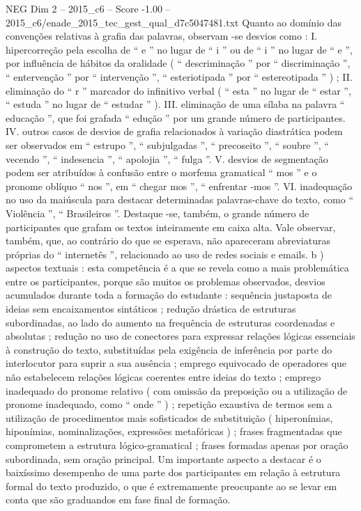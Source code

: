 \begin{textsample}{NEG Dim 2 – 2015\_c6 – Score -1.00 – 2015\_c6/enade\_2015\_tec\_gest\_qual\_d7c5047481.txt}
Quanto ao domínio das convenções relativas à grafia das palavras, observam -se desvios como : I. hipercorreção pela escolha de “ e ” no lugar de “ i ” ou de “ i ” no lugar de “ e ”, por influência de hábitos da oralidade ( “ descriminação ” por “ discriminação ”, “ entervenção ” por “ intervenção ”, “ esteriotipada ” por “ estereotipada ” ) ; II. eliminação do “ r ” marcador do infinitivo verbal ( “ esta ” no lugar de “ estar ”, “ estuda ” no lugar de “ estudar ” ).
III. eliminação de uma sílaba na palavra “ educação ”, que foi grafada “ edução ” por um grande número de participantes.
IV. outros casos de desvios de grafia relacionados à variação diastrática podem ser observados em “ estrupo ”, “ subjulgadas ”, “ precoseito ”, “ soubre ”, “ vecendo ”, “ indesencia ”, “ apolojia ”, “ fulga ”.
V. desvios de segmentação podem ser atribuídos à confusão entre o morfema gramatical “ mos ” e o pronome oblíquo “ nos ”, em “ chegar mos ”, “ enfrentar -mos ”.
VI. inadequação no uso da maiúscula para destacar determinadas palavras-chave do texto, como “ Violência ”, “ Brasileiros ”.
Destaque -se, também, o grande número de participantes que grafam os textos inteiramente em caixa alta.
Vale observar, também, que, ao contrário do que se esperava, não apareceram abreviaturas próprias do “ internetês ”, relacionado ao uso de redes sociais e emails. b ) aspectos textuais : esta competência é a que se revela como a mais problemática entre os participantes, porque são muitos os problemas observados, desvios acumulados durante toda a formação do estudante : sequência justaposta de ideias sem encaixamentos sintáticos ; redução drástica de estruturas subordinadas, ao lado do aumento na frequência de estruturas coordenadas e absolutas ; redução no uso de conectores para expressar relações lógicas essenciais à construção do texto, substituídas pela exigência de inferência por parte do interlocutor para suprir a sua ausência ; emprego equivocado de operadores que não estabelecem relações lógicas coerentes entre ideias do texto ; emprego inadequado do pronome relativo ( com omissão da preposição ou a utilização de pronome inadequado, como “ onde ” ) ; repetição exaustiva de termos sem a utilização de procedimentos mais sofisticados de substituição ( hiperonímias, hiponímias, nominalizações, expressões metafóricas ) ; frases fragmentadas que comprometem a estrutura lógico-gramatical ; frases formadas apenas por oração subordinada, sem oração principal.
Um importante aspecto a destacar é o baixíssimo desempenho de uma parte dos participantes em relação à estrutura formal do texto produzido, o que é extremamente preocupante ao se levar em conta que são graduandos em fase final de formação.

\end{textsample}
